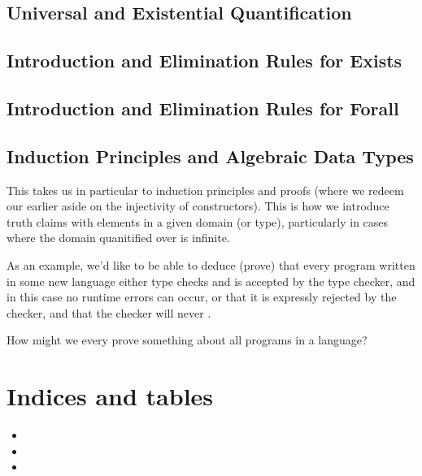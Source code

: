 \documentclass[letterpaper,10pt,english]{sphinxmanual}
\begin{document}
\section{Universal and Existential Quantification}
\label{\detokenize{12-quantification:universal-and-existential-quantification}}

\section{Introduction and Elimination Rules for Exists}
\label{\detokenize{12-quantification:introduction-and-elimination-rules-for-exists}}

\section{Introduction and Elimination Rules for Forall}
\label{\detokenize{12-quantification:introduction-and-elimination-rules-for-forall}}

\section{Induction Principles and Algebraic Data Types}
\label{\detokenize{12-quantification:induction-principles-and-algebraic-data-types}}
This takes us in particular to induction principles and proofs (where
we redeem our earlier aside on the injectivity of constructors). This
is how we introduce truth claims with  elements in a given
domain (or type), particularly in cases where the domain quanitified
over is infinite.

As an example, we’d like to be able to deduce (prove) that every
program written in some new language either type checks and is
accepted by the type checker, and in this case no runtime errors can
occur, or that it is expressly rejected by the checker, and that the
checker will never .

How might we every prove something about all programs in a language?


\chapter{Indices and tables}
\label{\detokenize{index:indices-and-tables}}\begin{itemize}
\item {} 

\item {} 

\item {} 

\end{itemize}



\renewcommand{\indexname}{Index}
\printindex
\end{document}
